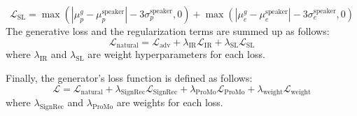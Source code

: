 \begin{equation}
    \mathcal{L}_{\mathrm{SL}} = \max(|\mu_{p}^{g} - \mu_{p}^{\mathrm{speaker}}| - 3\sigma_{p}^{\mathrm{speaker}}, 0) + \max(|\mu_{e}^{g} - \mu_{e}^{\mathrm{speaker}}| - 3\sigma_{e}^{\mathrm{speaker}}, 0)
\end{equation}
The generative loss and the regularization terms are summed up as follows:
\begin{equation}\label{eq:natural}
    \mathcal{L}_{\mathrm{natural}} = \mathcal{L}_{\mathrm{adv}} + \lambda_{\mathrm{IR}}\mathcal{L}_{\mathrm{IR}} + \lambda_{\mathrm{SL}}\mathcal{L}_{\mathrm{SL}} 
\end{equation}
where $\lambda_{\mathrm{IR}}$ and $\lambda_{\mathrm{SL}}$ are weight hyperparameters for each loss.

Finally, the generator's loss function is defined as follows:
\begin{equation}
    \mathcal{L} = \mathcal{L}_{\mathrm{natural}}+\lambda_{\mathrm{SignRec}}\mathcal{L}_{\mathrm{SignRec}}+\lambda_{\mathrm{ProMo}}\mathcal{L}_{\mathrm{ProMo}} + \lambda_{\mathrm{weight}} \mathcal{L}_{\mathrm{weight}}
\end{equation}
where $\lambda_{\mathrm{SignRec}}$ and $\lambda_{\mathrm{ProMo}}$ are weights for each loss.
